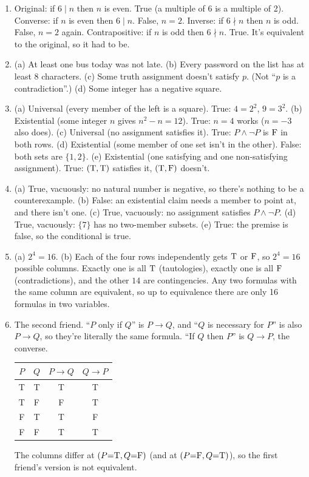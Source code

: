 \begin{enumerate}[label=\textbf{\arabic*.},leftmargin=1.8em,itemsep=0.45em]
  (d) \textbf{Not equivalent.} At $(P{=}\logT,Q{=}\logF)$: $\lnot(P\land Q)=\logT$ but $\lnot P\land\lnot Q=\logF$.
  \item Original: if $6\mid n$ then $n$ is even. True (a multiple of 6 is a multiple of 2).
  Converse: if $n$ is even then $6\mid n$. False, $n=2$.
  Inverse: if $6\nmid n$ then $n$ is odd. False, $n=2$ again.
  Contrapositive: if $n$ is odd then $6\nmid n$. True. It's equivalent to the original, so it had to be.
  \item (a) At least one bus today was not late. (b) Every password on the list has at least 8 characters. (c) Some truth assignment doesn't satisfy $p$. (Not ``$p$ is a contradiction''.) (d) Some integer has a negative square.
  \item (a) Universal (every member of the left is a square). True: $4=2^2$, $9=3^2$.
  (b) Existential (some integer $n$ gives $n^2-n=12$). True: $n=4$ works ($n=-3$ also does).
  (c) Universal (no assignment satisfies it). True: $P\land\lnot P$ is $\mathrm{F}$ in both rows.
  (d) Existential (some member of one set isn't in the other). False: both sets are $\{1,2\}$.
  (e) Existential (one satisfying and one non-satisfying assignment). True: $(\mathrm{T},\mathrm{T})$ satisfies it, $(\mathrm{T},\mathrm{F})$ doesn't.
  \item (a) True, vacuously: no natural number is negative, so there's nothing to be a counterexample.
  (b) False: an existential claim needs a member to point at, and there isn't one.
  (c) True, vacuously: no assignment satisfies $P\land\lnot P$.
  (d) True, vacuously: $\{7\}$ has no two-member subsets.
  (e) True: the premise is false, so the conditional is true.
  \item (a) $2^4=16$.
  (b) Each of the four rows independently gets $\mathrm{T}$ or $\mathrm{F}$, so $2^4=16$ possible columns. Exactly one is all $\mathrm{T}$ (tautologies), exactly one is all $\mathrm{F}$ (contradictions), and the other $14$ are contingencies. Any two formulas with the same column are equivalent, so up to equivalence there are only 16 formulas in two variables.
  \item The second friend. ``$P$ only if $Q$'' is $P\to Q$, and ``$Q$ is necessary for $P$'' is also $P\to Q$, so they're literally the same formula. ``If $Q$ then $P$'' is $Q\to P$, the converse.

  \smallskip\begin{tabular}{cc|cc}
  \toprule
  $P$ & $Q$ & $P\to Q$ & $Q\to P$\\
  \midrule
  T & T & T & T\\
  T & F & F & T\\
  F & T & T & F\\
  F & F & T & T\\
  \bottomrule
  \end{tabular}\par\smallskip

  The columns differ at $(P{=}\logT,Q{=}\logF)$ (and at $(P{=}\mathrm{F},Q{=}\mathrm{T})$), so the first friend's version is not equivalent.
\end{enumerate}
